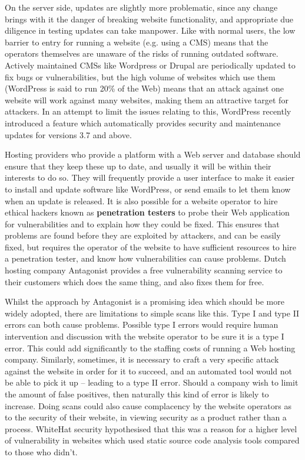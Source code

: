 \documentclass{acm_proc_article-sp}
\begin{document}
On the server side, updates are slightly more problematic, since any change brings with it the danger of breaking website functionality, and appropriate due diligence in testing updates can take manpower.  Like with normal users, the low barrier to entry for running a website (e.g. using a CMS) means that the operators themselves are unaware of the risks of running outdated software.  Actively maintained CMSs like Wordpress or Drupal are periodically updated to fix bugs or vulnerabilities, but the high volume of websites which use them (WordPress is said to run 20\% of the Web) means that an attack against one website will work against many websites, making them an attractive target for attackers.  In an attempt to limit the issues relating to this, WordPress recently introduced a feature which automatically provides security and maintenance updates for versions 3.7 and above.  

Hosting providers who provide a platform with a Web server and database should ensure that they keep these up to date, and usually it will be within their interests to do so.  They will frequently provide a user interface to make it easier to install and update software like WordPress, or send emails to let them know when an update is released.  It is also possible for a website operator to hire ethical hackers known as \textbf{penetration testers} to probe their Web application for vulnerabilities and to explain how they could be fixed.  This ensures that problems are found before they are exploited by attackers, and can be easily fixed, but requires the operator of the website to have sufficient resources to hire a penetration tester, and know how vulnerabilities can cause problems.  Dutch hosting company Antagonist provides a free vulnerability scanning service to their customers which does the same thing, and also fixes them for free.

Whilst the approach by Antagonist is a promising idea which should be more widely adopted, there are limitations to simple scans like this.  Type I and type II errors can both cause problems.  Possible type I errors would require human intervention and discussion with the website operator to be sure it is a type I error.  This could add significantly to the staffing costs of running a Web hosting company.  Similarly, sometimes, it is necessary to craft a very specific attack against the website in order for it to succeed, and an automated tool would not be able to pick it up -- leading to a type II error.  Should a company wish to limit the amount of false positives, then naturally this kind of error is likely to increase.  Doing scans could also cause complacency by the website operators as to the security of their website, in viewing security as a product rather than a process.  WhiteHat security hypothesised that this was a reason for a higher level of vulnerability in websites which used static source code analysis tools compared to those who didn't.
\end{document}
